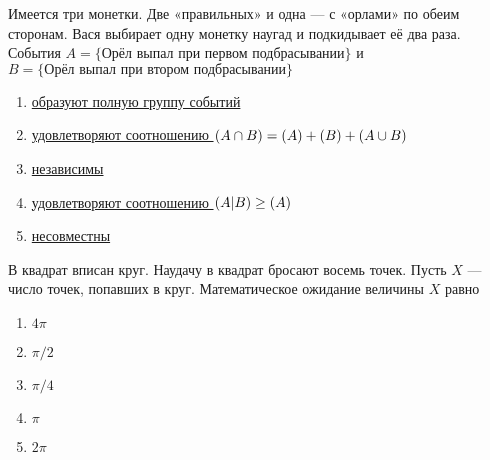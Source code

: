 \documentclass[t]{beamer}
\let\P\relax
\DeclareMathOperator{\P}{\mathbb{P}}
\begin{document}
 \begin{frame} \label{7} 
\begin{block}{7} 

Имеется три монетки. Две «правильных» и одна — с «орлами» по обеим сторонам. Вася выбирает одну монетку наугад и подкидывает её два раза. События $A = \{ \text{Орёл выпал при первом подбрасывании} \}$ и $B =\{\text{Орёл выпал при втором подбрасывании}\}$
   


 \end{block} 
\begin{enumerate} 
\item[] \hyperlink{7-No}{\beamergotobutton{} образуют полную группу событий}
\item[] \hyperlink{7-No}{\beamergotobutton{} удовлетворяют соотношению $\P(A\cap B)=\P(A)+\P(B) + \P(A\cup B)$
}
\item[] \hyperlink{7-No}{\beamergotobutton{} независимы}
\item[] \hyperlink{7-Yes}{\beamergotobutton{} удовлетворяют соотношению $\P(A|B)\geq \P(A)$}
\item[] \hyperlink{7-No}{\beamergotobutton{} несовместны}
\end{enumerate} 
\end{frame} 


 \begin{frame} \label{8} 
\begin{block}{8} 

В квадрат вписан круг. Наудачу в квадрат бросают восемь точек. Пусть $X$ — число точек, попавших в круг. Математическое ожидание величины $X$ равно
     


 \end{block} 
\begin{enumerate} 
\item[] \hyperlink{8-No}{\beamergotobutton{} $4 \pi$
}
\item[] \hyperlink{8-No}{\beamergotobutton{} $\pi / 2$}
\item[] \hyperlink{8-No}{\beamergotobutton{} $\pi / 4$}
\item[] \hyperlink{8-No}{\beamergotobutton{} $\pi$}
\item[] \hyperlink{8-Yes}{\beamergotobutton{} $2\pi$}
\end{enumerate} 
\end{frame} 
\end{document}

